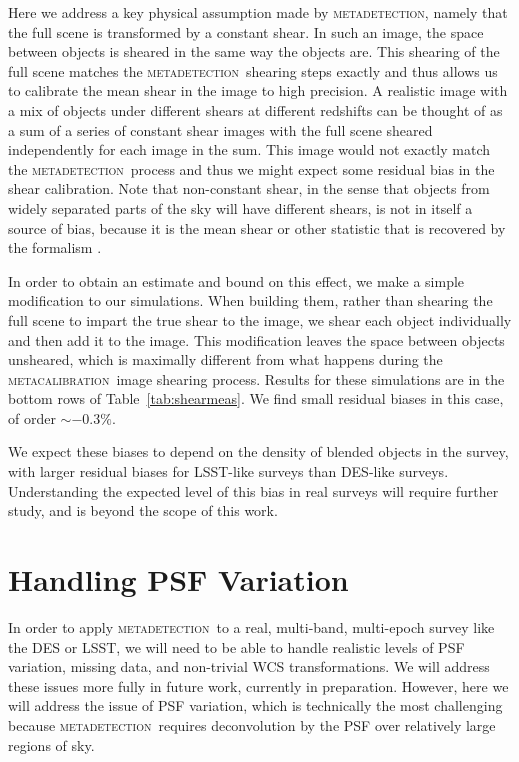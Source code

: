 \documentclass[fleqn,useAMS,usenatbib]{mnras}
\newcommand{\mcal}{\textsc{metacalibration}}
\newcommand{\mdet}{\textsc{metadetection}}
\begin{document}
Here we address a key physical assumption made by \mdet, namely that the full
scene is transformed by a constant shear. In such an image, the space between
objects is sheared in the same way the objects are. This shearing of the full
scene matches the \mdet\ shearing steps exactly and thus allows us to calibrate
the mean shear in the image to high precision. A realistic image with a mix of
objects under different shears at different redshifts can be thought of as a
sum of a series of constant shear images with the full scene sheared
independently for each image in the sum.  This image would not exactly match
the \mdet\ process and thus we might expect some residual bias in the shear
calibration.  Note that non-constant shear, in the sense that objects from
widely separated parts of the sky will have different shears, is not in itself
a source of bias, because it is the mean shear or other statistic that is
recovered by the formalism \citep{SheldonMcal2017}.

In order to obtain an estimate and bound on this effect, we make a simple
modification to our simulations. When building them, rather than shearing the
full scene to impart the true shear to the image, we shear each object
individually and then add it to the image. This modification leaves the space
between objects unsheared, which is maximally different from what happens
during the \mcal\ image shearing process. Results for these simulations are in
the bottom rows of Table~\ref{tab:shearmeas}. We find small residual biases in
this case, of order $\sim-0.3\%$.

We expect these biases to depend on the density of blended objects in the
survey, with larger residual biases for LSST-like surveys than DES-like
surveys. Understanding the expected level of this bias in real surveys will
require further study, and is beyond the scope of this work.

\section{Handling PSF Variation}
\label{sec:psfvar}

In order to apply \mdet\ to a real, multi-band, multi-epoch survey like the DES
or LSST, we will need to be able to handle realistic levels of PSF variation,
missing data, and non-trivial WCS transformations. We will address these issues
more fully in future work, currently in preparation. However, here we will
address the issue of PSF variation, which is technically the most challenging
because \mdet\ requires deconvolution by the PSF over relatively large regions
of sky.
\end{document}
